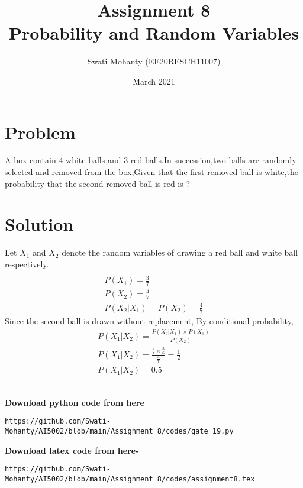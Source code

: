 \documentclass[journal,12pt,twocolumn]{IEEEtran}
\title{Assignment 8
\\Probability and Random Variables }
\author{Swati Mohanty (EE20RESCH11007) }
\date{March 2021}
\begin{document}
\maketitle


\section{Problem}
A box contain 4 white balls and 3 red balls.In succession,two balls are randomly selected and removed from the box,Given that the first removed ball is white,the probability that the second removed ball is red is ?

\section{Solution}
Let $X_1$ and $X_2$ denote the random variables of drawing a red ball and white ball respectively. 
\begin{align}
\\P(X_1) = \frac{3}{7}\\
P(X_2) = \frac{4}{7}
    \\P(X_2|X_1) = P(X_2) = \frac{4}{7}
\end{align}
Since the second ball is drawn without replacement, By conditional probability,
\begin{align}
    P(X_1|X_2) = \frac{P(X_2|X_1)\times P(X_1)}{P(X_2)}
    \\ P(X_1|X_2) = \frac{\frac{4}{7}\times \frac{3}{6} }{\frac{4}{7}} = \frac{1}{2}
    \\ P(X_1|X_2) = 0.5
\end{align}

\\\textbf{Download python code from here}\\
\begin{lstlisting}
https://github.com/Swati-Mohanty/AI5002/blob/main/Assignment_8/codes/gate_19.py
\end{lstlisting}
\textbf{Download latex code from here-}\\
\begin{lstlisting}
https://github.com/Swati-Mohanty/AI5002/blob/main/Assignment_8/codes/assignment8.tex
\end{lstlisting}
\end{document}
